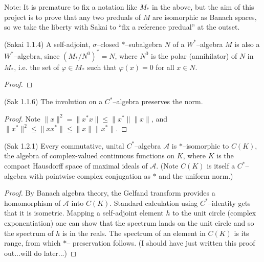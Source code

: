 Note: It is premature to fix a notation like $M_{*}$ in the above, but the aim of this project is to prove that any two
preduals of $M$ are isomorphic as Banach spaces, so we take the liberty with Sakai to ``fix a reference predual'' at the outset.

\begin{lemma}
    \label{lem:sigma_closed_star_subalg_wstar_Sak_1_1_4} (Sakai 1.1.4)
  A self-adjoint, $\sigma$--closed $*$--subalgebra $N$ of a $W^{*}$--algebra $M$ is also a $W^{*}$--algebra, since $(M_{*}/N^{0})^{*}=N$, where
  $N^{0}$ is the polar (annihilator) of $N$ in $M_{*}$, i.e. the set of $\varphi\in M_{*}$ such that $\varphi(x)=0$ for all $x\in N$.
\end{lemma}

\begin{proof}
\end{proof}

\begin{lemma}
  \label{lem:star_pres_norm_Sak_1_1_6} (Sak 1.1.6)
  \mathlibok
  The involution on a $C^{*}$--algebra preserves the norm.
\end{lemma}

\begin{proof}
  \leanok
  Note $\|x\|^{2}=\|x^{*}x\|\le \|x^{*}\|\|x\|$, and $\|x^{*}\|^{2}\le \|xx^{*}\|\le \|x\|\|x^{*}\|$.
\end{proof}

\begin{theorem}
  \label{thm:comm_cstar_cts_fcns_Sak_1_2_1} (Sak 1.2.1)
  \mathlibok
  Every commutative, unital $C^{*}$--algebra $\mathcal{A}$ is $*$--isomorphic to $C(K)$,
  the algebra of complex-valued continuous functions on $K$, where $K$ is the compact Hausdorff
  space of maximal ideals of $\mathcal{A}$. (Note $C(K)$ is itself a $C^{*}$--algebra with pointwise
  complex conjugation as $*$ and the uniform norm.)
\end{theorem}

\begin{proof}
  \leanok
  By Banach algebra theory, the Gelfand transform provides a homomorphism of $\mathcal{A}$ into $C(K)$.
  Standard calculation using $C^{*}$--identity gets that it is isometric. Mapping a self-adjoint element $h$
  to the unit circle (complex exponentiation) one can show that the spectrum lands on the unit circle and so
  the spectrum of $h$ is in the reals. The spectrum of an element in $C(K)$ is its range, from which $*$--
  preservation follows. (I should have just written this proof out...will do later...)
\end{proof}

